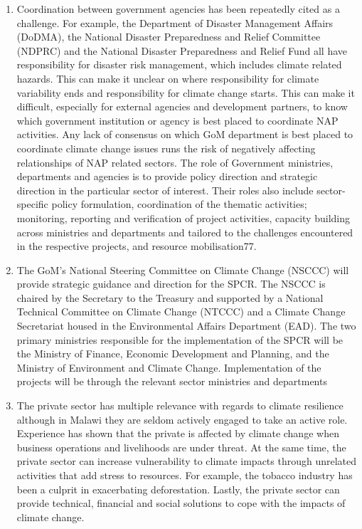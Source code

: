 \documentclass[
]{book}
\begin{document}
\begin{enumerate}
\def\labelenumi{\arabic{enumi}.}
\setcounter{enumi}{30}
\item
  Coordination between government agencies has been repeatedly cited as a challenge. For example, the Department of Disaster Management Affairs (DoDMA), the National Disaster Preparedness and Relief Committee (NDPRC) and the National Disaster Preparedness and Relief Fund all have responsibility for disaster risk management, which includes climate related hazards. This can make it unclear on where responsibility for climate variability ends and responsibility for climate change starts. This can make it difficult, especially for external agencies and development partners, to know which government institution or agency is best placed to coordinate NAP activities. Any lack of consensus on which GoM department is best placed to coordinate climate change issues runs the risk of negatively affecting relationships of NAP related sectors. The role of Government ministries, departments and agencies is to provide policy direction and strategic direction in the particular sector of interest. Their roles also include sector-specific policy formulation, coordination of the thematic activities; monitoring, reporting and verification of project activities, capacity building across ministries and departments and tailored to the challenges encountered in the respective projects, and resource mobilisation77.
\item
  The GoM's National Steering Committee on Climate Change (NSCCC) will provide strategic guidance and direction for the SPCR. The NSCCC is chaired by the Secretary to the Treasury and supported by a National Technical Committee on Climate Change (NTCCC) and a Climate Change Secretariat housed in the Environmental Affairs Department (EAD). The two primary ministries responsible for the implementation of the SPCR will be the Ministry of Finance, Economic Development and Planning, and the Ministry of Environment and Climate Change. Implementation of the projects will be through the relevant sector ministries and departments
\item
  The private sector has multiple relevance with regards to climate resilience although in Malawi they are seldom actively engaged to take an active role. Experience has shown that the private is affected by climate change when business operations and livelihoods are under threat. At the same time, the private sector can increase vulnerability to climate impacts through unrelated activities that add stress to resources. For example, the tobacco industry has been a culprit in exacerbating deforestation. Lastly, the private sector can provide technical, financial and social solutions to cope with the impacts of climate change.
\end{enumerate}
\end{document}
